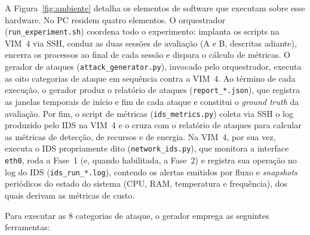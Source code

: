 \documentclass[12pt]{article}
\begin{document}
A Figura~\ref{fig:ambiente} detalha os elementos de software que executam sobre
esse hardware. No PC residem quatro elementos. O orquestrador
(\texttt{run\_experiment.sh}) coordena todo o experimento: implanta os scripts na
VIM~4 via SSH, conduz as duas sessões de avaliação (A e B, descritas adiante),
encerra os processos ao final de cada sessão e dispara o cálculo de métricas. O
gerador de ataques (\texttt{attack\_generator.py}), invocado pelo orquestrador,
executa as oito categorias de ataque em sequência contra a VIM~4. Ao término de
cada execução, o gerador produz o relatório de ataques (\texttt{report\_*.json}),
que registra as janelas temporais de início e fim de cada ataque e constitui o
\textit{ground truth} da avaliação. Por fim, o script de métricas
(\texttt{ids\_metrics.py}) coleta via SSH o log produzido pelo IDS na VIM~4 e o
cruza com o relatório de ataques para calcular as métricas de detecção, de
recursos e de energia. Na VIM~4, por sua vez, executa o IDS propriamente dito
(\texttt{network\_ids.py}), que monitora a interface \texttt{eth0}, roda a Fase~1
(e, quando habilitada, a Fase~2) e registra sua operação no log do IDS
(\texttt{ids\_run\_*.log}), contendo os alertas emitidos por fluxo e
\textit{snapshots} periódicos do estado do sistema (CPU, RAM, temperatura e
frequência), dos quais derivam as métricas de custo.

Para executar as 8 categorias de ataque, o gerador emprega as seguintes
ferramentas:
\end{document}
